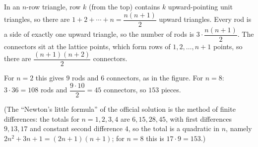 In an $n$-row triangle, row $k$ (from the top) contains $k$ upward-pointing unit triangles, so there are $1+2+\cdots+n=\dfrac{n(n+1)}{2}$ upward triangles. Every rod is a side of exactly one upward triangle, so the number of rods is $3\cdot\dfrac{n(n+1)}{2}$. The connectors sit at the lattice points, which form rows of $1,2,\dots,n+1$ points, so there are $\dfrac{(n+1)(n+2)}{2}$ connectors.

For $n=2$ this gives $9$ rods and $6$ connectors, as in the figure. For $n=8$: $3\cdot36=108$ rods and $\dfrac{9\cdot10}{2}=45$ connectors, so $\boxed{153}$ pieces.

(The ``Newton's little formula'' of the official solution is the method of finite differences: the totals for $n=1,2,3,4$ are $6,15,28,45$, with first differences $9,13,17$ and constant second difference $4$, so the total is a quadratic in $n$, namely $2n^2+3n+1=(2n+1)(n+1)$; for $n=8$ this is $17\cdot9=153$.)
